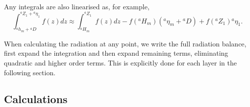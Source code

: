 \documentclass[11pt, a4paper,twoside]{article}
\newcommand{\etb}[2]{{{}^{#1}\eta_{#2}}}
\newcommand{\HH}[2]{{{}^{#1}H_{#2}}}
\newcommand{\Z}[2]{{{}^{#1}Z_{#2}}}
\newcommand{\h}[2]{{{}^{#1}h_{#2}}}
\newcommand{\D}[1]{{}^{#1}D}
\numberwithin{equation}{section}
\begin{document}
Any integrals are also linearised as, for example,
\begin{equation}
\int_{\h{a}{m} + \D{a} }^{\Z{a}{1} + \etb{a}{1}}f(z)dz \approx \int_{\HH{a}{m} }^{\Z{a}{1}}f(z)dz - f(\HH{a}{m}) (\etb{a}{m}+\D{a}) + f(\Z{a}{1}) \etb{a}{1}.
\end{equation}

When calculating the radiation at any point, we write the full radiation balance, first expand the integration and then expand remaining terms, eliminating quadratic and higher order terms.
This is explicitly done for each layer in the following section.

\subsection{Calculations}
\end{document}
